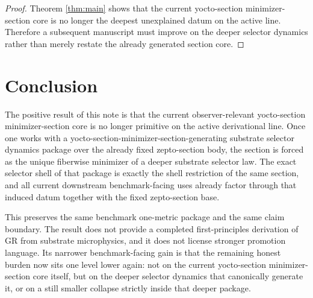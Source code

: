 \documentclass[11pt]{article}
\begin{document}
\begin{proof}
Theorem \ref{thm:main} shows that the current yocto-section minimizer-section core is no longer the deepest unexplained datum on the active line. Therefore a subsequent manuscript must improve on the deeper selector dynamics rather than merely restate the already generated section core.
\end{proof}

\section{Conclusion}

The positive result of this note is that the current observer-relevant yocto-section minimizer-section core is no longer primitive on the active derivational line. Once one works with a yocto-section-minimizer-section-generating substrate selector dynamics package over the already fixed zepto-section body, the section is forced as the unique fiberwise minimizer of a deeper substrate selector law. The exact selector shell of that package is exactly the shell restriction of the same section, and all current downstream benchmark-facing uses already factor through that induced datum together with the fixed zepto-section base.

This preserves the same benchmark one-metric package and the same claim boundary. The result does not provide a completed first-principles derivation of GR from substrate microphysics, and it does not license stronger promotion language. Its narrower benchmark-facing gain is that the remaining honest burden now sits one level lower again: not on the current yocto-section minimizer-section core itself, but on the deeper selector dynamics that canonically generate it, or on a still smaller collapse strictly inside that deeper package.
\end{document}
